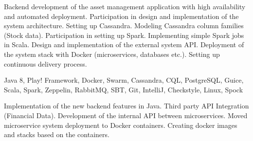 \documentclass[]{deedy-resume-openfont}
\begin{document}
\begin{minipage}[t]{0.66\textwidth}
Backend development of the asset management application with high availability and automated deployment.
Participation in design and implementation of the system architecture. 
Setting up Cassandra. Modeling Cassandra column families (Stock data).
Participation in setting up Spark. Implementing simple Spark jobs in Scala. 
Design and implementation of the external system API.
Deployment of the system stack with Docker (microservices, databases etc.).
Setting up continuous delivery process.

 Java 8, Play! Framework, Docker, Swarm, Cassandra, CQL, PostgreSQL, Guice, Scala, Spark, Zeppelin, RabbitMQ, SBT, Git, IntelliJ, Checkstyle, Linux, Spock
\sectionsep

Implementation of the new backend features in Java.
Third party API Integration (Financial Data).
Development of the internal API between microservices.
Moved microservice system deployment to Docker containers. Creating docker images and stacks based on the containers.


\end{minipage}
\end{document}

